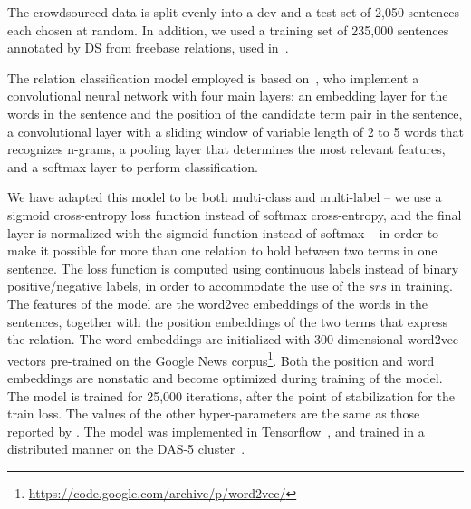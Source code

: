 The crowdsourced data is split evenly into a dev and a test set of 2,050 sentences each chosen at random. In addition, we used a training set of 235,000 sentences annotated by DS from freebase relations, used in~\citet{riedel2013relation}.

The relation classification model employed is based on~\citet{nguyen2015relation}, who implement a convolutional neural network with four main layers: an embedding layer for the words in the sentence and the position of the candidate term pair in the sentence, a convolutional layer with a sliding window of variable length of 2 to 5 words that recognizes n-grams, a pooling layer that determines the most relevant features, and a softmax layer to perform classification.

We have adapted this model to be both multi-class and multi-label -- we use a sigmoid cross-entropy loss function instead of softmax cross-entropy, and the final layer is normalized with the sigmoid function instead of softmax -- in order to make it possible for more than one relation to hold between two terms in one sentence. The loss function is computed using continuous labels instead of binary positive/negative labels, in order to accommodate the use of the $srs$ in training. The features of the model are the word2vec embeddings of the words in the sentences, together with the position embeddings of the two terms that express the relation. The word embeddings are initialized with 300-dimensional word2vec vectors pre-trained on the Google News corpus\footnote{\url{https://code.google.com/archive/p/word2vec/}}. Both the position and word embeddings are nonstatic and become optimized during training of the model. The model is trained for 25,000 iterations, after the point of stabilization for the train loss.  The values of the other hyper-parameters are the same as those reported by \citet{nguyen2015relation}. The model was implemented in Tensorflow~\cite{abadi2016tensorflow}, and trained in a distributed manner on the DAS-5 cluster~\cite{bal2016medium}. 

